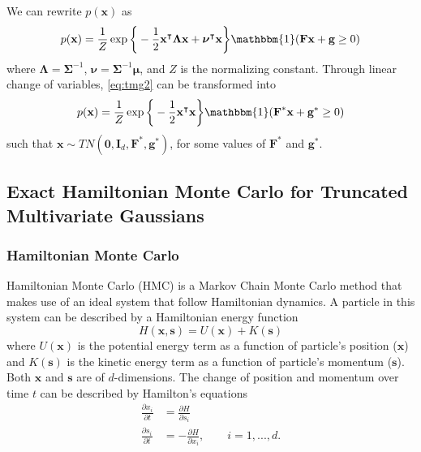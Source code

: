 \documentclass{scrartcl}
\numberwithin{equation}{section}
\begin{document}
We can rewrite $p(\boldsymbol{\textbf{x}})$ as
\begin{equation}\label{eq:tmg2}
	p(\textbf{x}) = \frac1Z\exp\bigg\{-\frac{1}{2}\textbf{x}^{\intercal} \boldsymbol{\Lambda} \textbf{x} + \boldsymbol{\nu}^{\intercal}\textbf{x}\bigg\}\mathbbm{1}(\textbf{F}\textbf{x} + \textbf{g} \geq 0)
\end{equation}
where $\boldsymbol{\Lambda} = \boldsymbol{\Sigma}^{-1}$, $\boldsymbol{\nu} = \boldsymbol{\Sigma}^{-1}\boldsymbol{\mu}$, and $Z$ is the normalizing constant. Through linear change of variables, \eqref{eq:tmg2} can be transformed into
\begin{equation}\label{eq:tmg3}
	p(\textbf{x}) = \frac1Z\exp\bigg\{-\frac{1}{2}\textbf{x}^{\intercal}\textbf{x}\bigg\}\mathbbm{1}(\textbf{F}^*\textbf{x} + \textbf{g}^* \geq 0)
\end{equation}
such that $\textbf{x} \sim TN(\textbf{0}, \textbf{I}_d,\textbf{F}^*,\textbf{g}^*)$, for some values of $\textbf{F}^*$ and $\textbf{g}^*$.









\subsection{Exact Hamiltonian Monte Carlo for Truncated Multivariate Gaussians}   
\subsubsection{Hamiltonian Monte Carlo}
Hamiltonian Monte Carlo (HMC) is a Markov Chain Monte Carlo method that makes use of an ideal system that follow Hamiltonian dynamics. A particle in this system can be described by a Hamiltonian energy function
\begin{equation}\label{eq:hml}
	H(\textbf{x}, \textbf{s}) = U(\textbf{x}) + K(\textbf{s})
\end{equation}
where $U(\textbf{x})$ is the potential energy term as a function of particle's position ($\textbf{x}$) and $K(\textbf{s})$ is the kinetic energy term as a function of particle's momentum ($\textbf{s}$). Both $\textbf{x}$ and $\textbf{s}$ are of $d$-dimensions.   
The change of position and momentum over time $t$ can be described by Hamilton's equations
\begin{equation}\label{eq:heqs}
\begin{split}
	\frac{\partial x_i}{\partial t} & = \frac{\partial H}{\partial s_i} \\
	\frac{\partial s_i}{\partial t} & = -\frac{\partial H}{\partial x_i}, \qquad i=1,...,d.\\
\end{split}
\end{equation}
\end{document}
